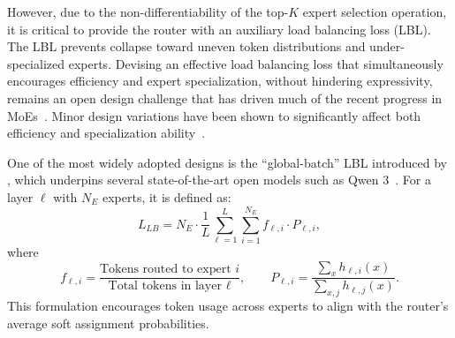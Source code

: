\documentclass[11pt, a4paper]{include/gdm_format}
\begin{document}
{However, due to the non-differentiability of the top-$K$ expert selection operation, it is critical to provide the router with an auxiliary load balancing loss (LBL). The LBL prevents collapse toward uneven token distributions and under-specialized experts. Devising an effective load balancing loss that simultaneously encourages efficiency and expert specialization, without hindering expressivity, remains an open design challenge that has driven much of the recent progress in MoEs~\citep{moe_sem_2, moe_mod_2_switch_1exp, moe_lbl_evo1, moe_lbl_evo2_zloss, moe_lbl_evo3, moe_deepseek_moe, moe_deepseek_demon, moe_similar_olmoe}. Minor design variations have been shown to significantly affect both efficiency and specialization ability~\citep{moe_deepseek_moe, moe_mixtral_lack_spec, moe_chameleon_lack_spec, moe_deepseek_demon_conc, moe_deepseek_demon}. 

One of the most widely adopted designs is the ``global-batch'' LBL introduced by \citet{moe_sem_2}, which underpins several state-of-the-art open models such as Qwen 3~\citep{moe_qwen3}. For a layer $\ell$ with $N_E$ experts, it is defined as:
\begin{equation}
\label{eq:moe_modern_lbl_extended}
L_{LB} = N_E \cdot \frac{1}{L}\sum_{\ell=1}^L \sum_{i=1}^{N_E} f_{\ell,i} \cdot P_{\ell,i},
\end{equation}
where
\[
f_{\ell,i} = \frac{\text{Tokens routed to expert } i}{\text{Total tokens in layer } \ell}, \qquad
P_{\ell,i} = \frac{\sum_{x} h_{\ell,i}(x)}{\sum_{x,j} h_{\ell,j}(x)}.
\]
This formulation encourages token usage across experts to align with the router’s average soft assignment probabilities.

}
\end{document}
